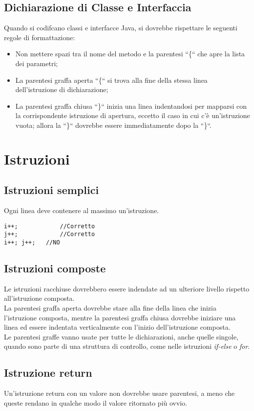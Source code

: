 \subsection{Dichiarazione di Classe e Interfaccia}
Quando si codifcano classi e interfacce Java, si dovrebbe rispettare le seguenti regole di formattazione:
\begin{itemize}
\item Non mettere spazi tra il nome del metodo e la parentesi ``\{`` che apre la lista dei parametri;
\item La parentesi graffa aperta ``\{`` si trova alla fine della stessa linea dell'istruzione di dichiarazione;
\item La parentesi graffa chiusa ``\}`` inizia una linea indentandosi per mapparsi con la corrispondente istruzione di apertura, eccetto il caso in cui c'è un'istruzione vuota; allora la ``\}`` dovrebbe essere immediatamente dopo la ``\}``. 
\end{itemize}
\clearpage
%
%
\section{Istruzioni}
\subsection{Istruzioni semplici}
Ogni linea deve contenere al massimo un'istruzione.
\begin{lstlisting}
i++;			//Corretto
j++;			//Corretto
i++; j++;	//NO
\end{lstlisting}
\subsection{Istruzioni composte}
Le istruzioni racchiuse dovrebbero essere indendate ad un ulteriore livello rispetto all'istruzione composta.\\
La parentesi graffa aperta dovrebbe stare alla fine della linea che inizia l'istruzione composta, mentre la parentesi graffa chiusa dovrebbe iniziare una linea ed essere indentata verticalmente con l'inizio dell'istruzione composta.\\
Le parentesi graffe vanno usate per tutte le dichiarazioni, anche quelle singole, quando sono parte di una struttura di controllo, come nelle istruzioni \textit{if-else} o \textit{for}.
\subsection{Istruzione return}
Un'istruzione return con un valore non dovrebbe usare parentesi, a meno che queste rendano in qualche modo il valore ritornato più ovvio.
